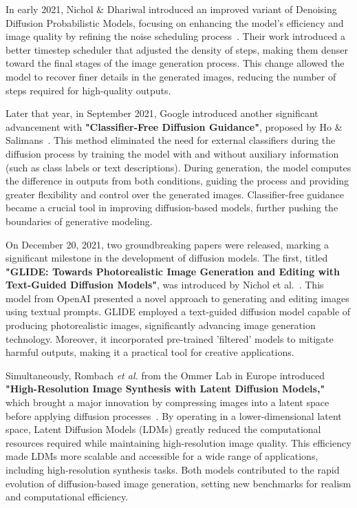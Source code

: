 \documentclass[12pt,DIV14,BCOR12mm,a4paper,footinclude=false,headinclude,parskip=half-,twoside,openright,cleardoublepage=empty,toc=index,bibliography=totoc,listof=totoc]{scrreprt}
\numberwithin{equation}{chapter}
\begin{document}
In early 2021, Nichol \& Dhariwal introduced an improved variant of Denoising Diffusion Probabilistic Models, focusing on enhancing the model's efficiency and image quality by refining the noise scheduling process~\cite{Improved_denoising_diffusion}. Their work introduced a better timestep scheduler that adjusted the density of steps, making them denser toward the final stages of the image generation process. This change allowed the model to recover finer details in the generated images, reducing the number of steps required for high-quality outputs.

Later that year, in September 2021, Google introduced another significant advancement with \textbf{"Classifier-Free Diffusion Guidance"}, proposed by Ho \& Salimans~\cite{ho2022classifier}. This method eliminated the need for external classifiers during the diffusion process by training the model with and without auxiliary information (such as class labels or text descriptions). During generation, the model computes the difference in outputs from both conditions, guiding the process and providing greater flexibility and control over the generated images. Classifier-free guidance became a crucial tool in improving diffusion-based models, further pushing the boundaries of generative modeling.

On December 20, 2021, two groundbreaking papers were released, marking a significant milestone in the development of diffusion models. The first, titled \textbf{"GLIDE: Towards Photorealistic Image Generation and Editing with Text-Guided Diffusion Models"}, was introduced by Nichol et al.~\cite{nichol2021glide}. This model from OpenAI presented a novel approach to generating and editing images using textual prompts. GLIDE employed a text-guided diffusion model capable of producing photorealistic images, significantly advancing image generation technology. Moreover, it incorporated pre-trained 'filtered' models to mitigate harmful outputs, making it a practical tool for creative applications.

Simultaneously, Rombach \textit{et al.} from the Ommer Lab in Europe introduced \textbf{"High-Resolution Image Synthesis with Latent Diffusion Models,"} which brought a major innovation by compressing images into a latent space before applying diffusion processes~\cite{Latent_Diffusion}. By operating in a lower-dimensional latent space, Latent Diffusion Models (LDMs) greatly reduced the computational resources required while maintaining high-resolution image quality. This efficiency made LDMs more scalable and accessible for a wide range of applications, including high-resolution synthesis tasks. Both models contributed to the rapid evolution of diffusion-based image generation, setting new benchmarks for realism and computational efficiency.
\end{document}
